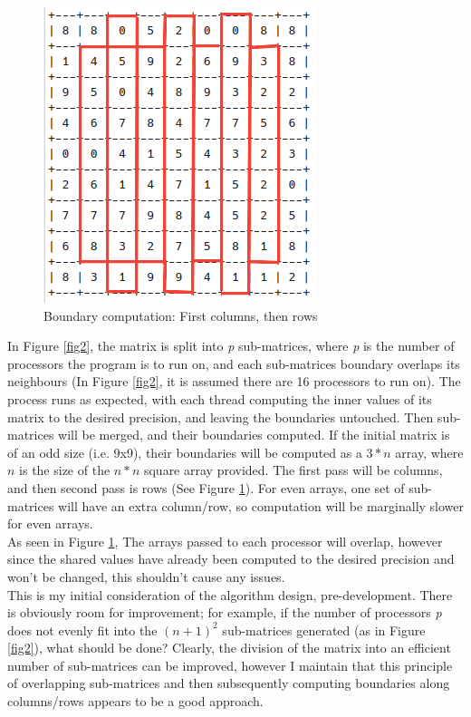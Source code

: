 \documentclass{article}
\begin{document}
\begin{figure}
    \centering
    \includegraphics[scale=0.5]{3.png}
    \caption{Boundary computation: First columns, then rows}
    \label{fig3}
\end{figure}
In Figure \ref{fig2}, the matrix is split into \textit{p} sub-matrices, where \textit{p} is the number of processors the program is to run on, and each sub-matrices boundary overlaps its neighbours (In Figure \ref{fig2}, it is assumed there are 16 processors to run on). The process runs as expected, with each thread computing the inner values of its matrix to the desired precision, and leaving the boundaries untouched.
Then sub-matrices will be merged, and their boundaries computed. If the initial matrix is of an odd size (i.e. 9x9), their boundaries will be computed as a $3*n$ array, where $n$ is the size of the $n*n$ square array provided. The first pass will be columns, and then second pass is rows (See Figure \ref{fig3}). For even arrays, one set of sub-matrices will have an extra column/row, so computation will be marginally slower for even arrays.\\
As seen in Figure \ref{fig3}, The arrays passed to each processor will overlap, however since the shared values have already been computed to the desired precision and won't be changed, this shouldn't cause any issues. \\
This is my initial consideration of the algorithm design, pre-development. There is obviously room for improvement; for example, if the number of processors \textit{p} does not evenly fit into the $(n+1)^2$ sub-matrices generated (as in Figure \ref{fig2}), what should be done? Clearly, the division of the matrix into an efficient number of sub-matrices can be improved, however I maintain that this principle of overlapping sub-matrices and then subsequently computing boundaries along columns/rows appears to be a good approach.
\end{document}
